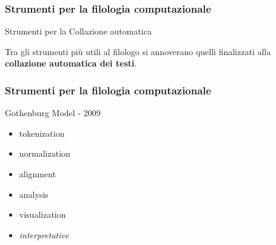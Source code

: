 \begin{frame}
	\frametitle{Strumenti per la filologia computazionale}
	\addtocounter{nframe}{1}
    \begin{block}{Strumenti per la Collazione automatica}
            
        \begin{center}
            Tra gli strumenti più utili al filologo si annoverano quelli finalizzati alla \textbf{collazione automatica dei testi}.

		\end{center}
    \end{block}
    
\end{frame}

\begin{frame}
	\frametitle{Strumenti per la filologia computazionale}
	\addtocounter{nframe}{1}
        
    \begin{block}{Gothenburg Model - 2009}
            \begin{itemize}
                \item tokenization
                \item normalization
                \item alignment
                \item analysis
                \item visualization
                \item \textit{interpretative}
            \end{itemize}
    \end{block}
\end{frame}

